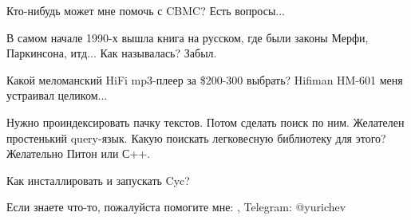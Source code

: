 \myhrule{}

Кто-нибудь может мне помочь с CBMC? Есть вопросы...

\myhrule{}

В самом начале 1990-х вышла книга на русском, где были законы Мерфи, Паркинсона, итд...
Как называлась?
Забыл.

\myhrule{}

Какой меломанский HiFi mp3-плеер за \$200-300 выбрать?
Hifiman HM-601 меня устраивал целиком...

\myhrule{}

Нужно проиндексировать пачку текстов. Потом сделать поиск по ним. Желателен простенький query-язык.
Какую поискать легковесную библиотеку для этого?
Желательно Питон или С++.

\myhrule{}

Как инсталлировать и запускать Cyc?

\myhrule{}

Если знаете что-то, пожалуйста помогите мне: \EMAIL{}, Telegram: @yurichev
